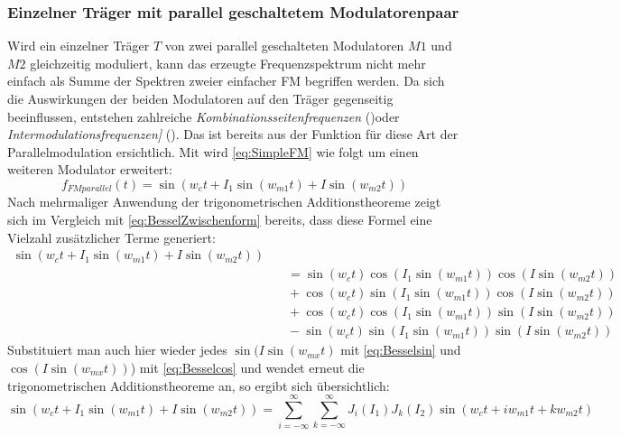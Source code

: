 \subsubsection{Einzelner Träger mit parallel geschaltetem Modulatorenpaar}
\label{singlecarryparallelmod}
Wird ein einzelner Träger $T$ von zwei parallel geschalteten Modulatoren $M1$ und $M2$ gleichzeitig moduliert, kann das erzeugte Frequenzspektrum nicht mehr einfach als Summe der Spektren zweier einfacher FM begriffen werden. Da sich die Auswirkungen der beiden Modulatoren auf den Träger gegenseitig beeinflussen, entstehen zahlreiche \textit{Kombinationsseitenfrequenzen} (\cite[S.117]{fmtheory})oder \textit{Intermodulationsfrequenzen]} (\cite{schottiWeb}). Das ist bereits aus der Funktion für diese Art der Parallelmodulation ersichtlich. Mit \cite[S.46]{schottstaedt} wird \ref{eq:SimpleFM} wie folgt um einen weiteren Modulator erweitert:
\begin{equation}
f_{FMparallel}(t) = \sin(w_ct + I_1\sin(w_{m1}t) + I\sin(w_{m2}t))
\end{equation}
Nach mehrmaliger Anwendung der trigonometrischen Additionstheoreme zeigt sich im Vergleich mit \ref{eq:BesselZwischenform} bereits, dass diese Formel eine Vielzahl zusätzlicher Terme generiert:
\begin{equation}
\begin{split}
\sin(w_ct + I_1\sin(w_{m1}t) + I\sin(w_{m2}t)) \\ &\quad = \sin(w_ct)\cos(I_1\sin(w_{m1}t))\cos(I\sin(w_{m2}t)) \\ &\quad + \cos(w_ct)\sin(I_1\sin(w_{m1}t))\cos(I\sin(w_{m2}t)) \\ &\quad +\cos(w_ct)\cos(I_1\sin(w_{m1}t))\sin(I\sin(w_{m2}t)) \\ &\quad -\sin(w_ct)\sin(I_1\sin(w_{m1}t))\sin(I\sin(w_{m2}t))
\end{split}
\end{equation}
Substituiert man auch hier wieder jedes \begin{math} \sin(I\sin(w_{mx}t) \end{math} mit \ref{eq:Besselsin} und \begin{math} \cos(I\sin(w_{mx}t)) \end{math}) mit \ref{eq:Besselcos} und wendet erneut die trigonometrischen Additionstheoreme an, so ergibt sich übersichtlich:
\begin{equation}\label{eq:ParallelKompakt}
\sin(w_ct + I_1\sin(w_{m1}t) + I\sin(w_{m2}t)) = \sum_{i=-\infty}^{\infty}\sum_{k=-\infty}^{\infty}J_i(I_1)J_k(I_2)\sin(w_ct + iw_{m1}t + kw_{m2}t)
\end{equation}
